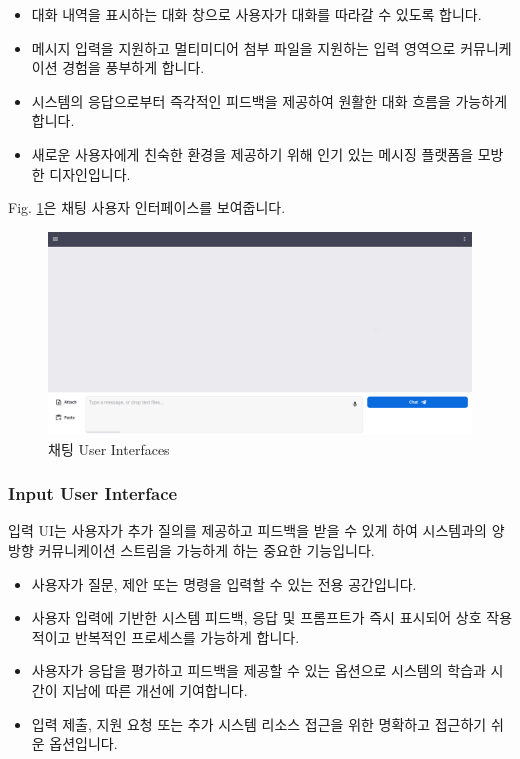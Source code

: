 \documentclass[a4paper, 12pt]{article}
\begin{document}
\begin{itemize}
\item 대화 내역을 표시하는 대화 창으로 사용자가 대화를 따라갈 수 있도록 합니다.
\item 메시지 입력을 지원하고 멀티미디어 첨부 파일을 지원하는 입력 영역으로 커뮤니케이션 경험을 풍부하게 합니다.
\item 시스템의 응답으로부터 즉각적인 피드백을 제공하여 원활한 대화 흐름을 가능하게 합니다.
\item 새로운 사용자에게 친숙한 환경을 제공하기 위해 인기 있는 메시징 플랫폼을 모방한 디자인입니다.
\end{itemize}

Fig. \ref{fig:chat}은 채팅 사용자 인터페이스를 보여줍니다.

\begin{figure}[H]
\centering
\includegraphics[width=1\textwidth]{img/chat.png}
\caption{채팅 User Interfaces}
\label{fig:chat}
\end{figure}

\subsubsection{Input User Interface}

입력 UI는 사용자가 추가 질의를 제공하고 피드백을 받을 수 있게 하여 시스템과의 양방향 커뮤니케이션 스트림을 가능하게 하는 중요한 기능입니다.

\begin{itemize}
\item 사용자가 질문, 제안 또는 명령을 입력할 수 있는 전용 공간입니다.
\item 사용자 입력에 기반한 시스템 피드백, 응답 및 프롬프트가 즉시 표시되어 상호 작용적이고 반복적인 프로세스를 가능하게 합니다.
\item 사용자가 응답을 평가하고 피드백을 제공할 수 있는 옵션으로 시스템의 학습과 시간이 지남에 따른 개선에 기여합니다.
\item 입력 제출, 지원 요청 또는 추가 시스템 리소스 접근을 위한 명확하고 접근하기 쉬운 옵션입니다.
\end{itemize}
\end{document}
